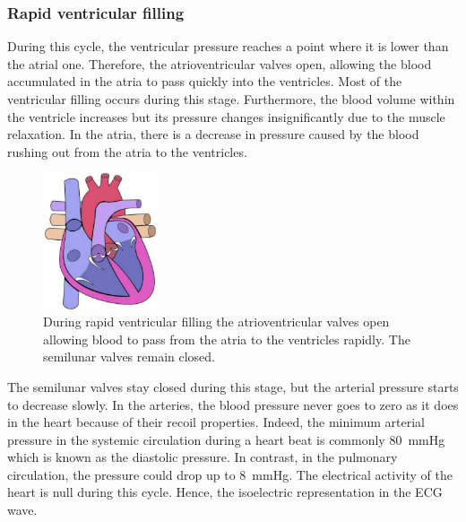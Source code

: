 \subsubsection{Rapid ventricular filling}
During this cycle, the ventricular pressure reaches a point where it is lower than the atrial one. Therefore, the atrioventricular valves open, allowing the blood accumulated in the atria to pass quickly into the ventricles. Most of the ventricular filling occurs during this stage. Furthermore, the blood volume within the ventricle increases but its pressure changes insignificantly due to the muscle relaxation. In the atria, there is a decrease in pressure  caused by the blood rushing out from the atria to the ventricles. 

\begin{figure}[!htpb]
	\centering
	\includegraphics[height=4cm,keepaspectratio]{figure_12}
	\caption[Heart during rapid ventricular filling]{During rapid ventricular filling the atrioventricular valves open allowing blood to pass from the atria to the ventricles rapidly. The semilunar valves remain closed.}
	\label{fig:heart rapid ventricular filling}
\end{figure}

The semilunar valves stay closed during this stage, but the arterial pressure starts to decrease slowly. In the arteries, the blood pressure never goes to zero as it does in the heart because of their recoil properties. Indeed, the minimum arterial pressure in the systemic circulation during a heart beat is commonly \SI{80}{\mmHg} which is known as the diastolic pressure. In contrast, in the pulmonary circulation, the pressure could drop up to \SI{8}{\mmHg}. The electrical activity of the heart is null during this cycle. Hence, the isoelectric representation in the ECG wave.


